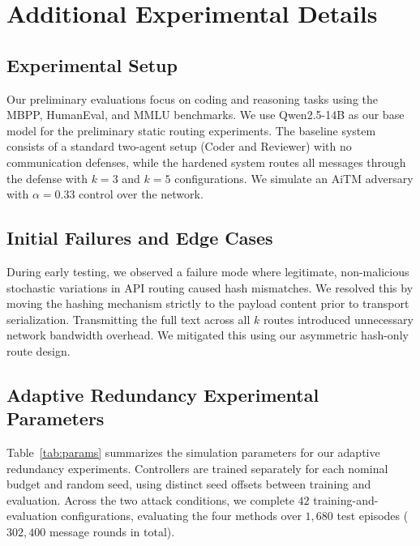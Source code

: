 \documentclass{article}
\begin{document}
\section{Additional Experimental Details}
\subsection{Experimental Setup}
Our preliminary evaluations focus on coding and reasoning tasks using the MBPP, HumanEval, and MMLU benchmarks. We use Qwen2.5-14B as our base model for the preliminary static routing experiments. The baseline system consists of a standard two-agent setup (Coder and Reviewer) with no communication defenses, while the hardened system routes all messages through the defense with $k=3$ and $k=5$ configurations. We simulate an AiTM adversary with $\alpha = 0.33$ control over the network.

\subsection{Initial Failures and Edge Cases}
During early testing, we observed a failure mode where legitimate, non-malicious stochastic variations in API routing caused hash mismatches. We resolved this by moving the hashing mechanism strictly to the payload content prior to transport serialization. Transmitting the full text across all $k$ routes introduced unnecessary network bandwidth overhead. We mitigated this using our asymmetric hash-only route design.

\subsection{Adaptive Redundancy Experimental Parameters}
Table~\ref{tab:params} summarizes the simulation parameters for our adaptive redundancy experiments. Controllers are trained separately for each nominal budget and random seed, using distinct seed offsets between training and evaluation. Across the two attack conditions, we complete $42$ training-and-evaluation configurations, evaluating the four methods over $1{,}680$ test episodes ($302{,}400$ message rounds in total).
\end{document}
